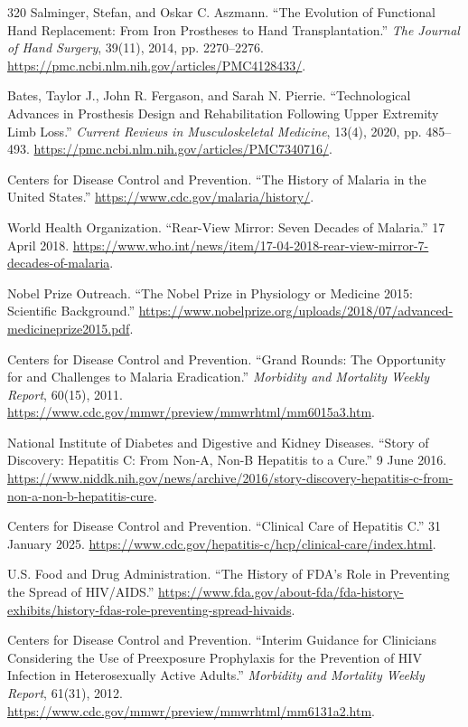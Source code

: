 \documentclass[12pt,oneside]{book}
\begin{document}
\begin{thebibliography}{320}
Salminger, Stefan, and Oskar C. Aszmann. ``The Evolution of Functional Hand
Replacement: From Iron Prostheses to Hand Transplantation.'' \emph{The
Journal of Hand Surgery}, 39(11), 2014, pp. 2270--2276.
\url{https://pmc.ncbi.nlm.nih.gov/articles/PMC4128433/}.

Bates, Taylor J., John R. Fergason, and Sarah N. Pierrie. ``Technological
Advances in Prosthesis Design and Rehabilitation Following Upper Extremity
Limb Loss.'' \emph{Current Reviews in Musculoskeletal Medicine}, 13(4), 2020,
pp. 485--493.
\url{https://pmc.ncbi.nlm.nih.gov/articles/PMC7340716/}.

Centers for Disease Control and Prevention. ``The History of Malaria in the
United States.'' \url{https://www.cdc.gov/malaria/history/}.

World Health Organization. ``Rear-View Mirror: Seven Decades of Malaria.''
17 April 2018. \url{https://www.who.int/news/item/17-04-2018-rear-view-mirror-7-decades-of-malaria}.

Nobel Prize Outreach. ``The Nobel Prize in Physiology or Medicine 2015:
Scientific Background.''
\url{https://www.nobelprize.org/uploads/2018/07/advanced-medicineprize2015.pdf}.

Centers for Disease Control and Prevention. ``Grand Rounds: The Opportunity
for and Challenges to Malaria Eradication.'' \emph{Morbidity and Mortality
Weekly Report}, 60(15), 2011.
\url{https://www.cdc.gov/mmwr/preview/mmwrhtml/mm6015a3.htm}.

National Institute of Diabetes and Digestive and Kidney Diseases. ``Story of
Discovery: Hepatitis C: From Non-A, Non-B Hepatitis to a Cure.'' 9 June 2016.
\url{https://www.niddk.nih.gov/news/archive/2016/story-discovery-hepatitis-c-from-non-a-non-b-hepatitis-cure}.

Centers for Disease Control and Prevention. ``Clinical Care of Hepatitis C.''
31 January 2025.
\url{https://www.cdc.gov/hepatitis-c/hcp/clinical-care/index.html}.

U.S. Food and Drug Administration. ``The History of FDA's Role in Preventing
the Spread of HIV/AIDS.''
\url{https://www.fda.gov/about-fda/fda-history-exhibits/history-fdas-role-preventing-spread-hivaids}.

Centers for Disease Control and Prevention. ``Interim Guidance for Clinicians
Considering the Use of Preexposure Prophylaxis for the Prevention of HIV
Infection in Heterosexually Active Adults.'' \emph{Morbidity and Mortality
Weekly Report}, 61(31), 2012.
\url{https://www.cdc.gov/mmwr/preview/mmwrhtml/mm6131a2.htm}.


\end{thebibliography}
\end{document}
